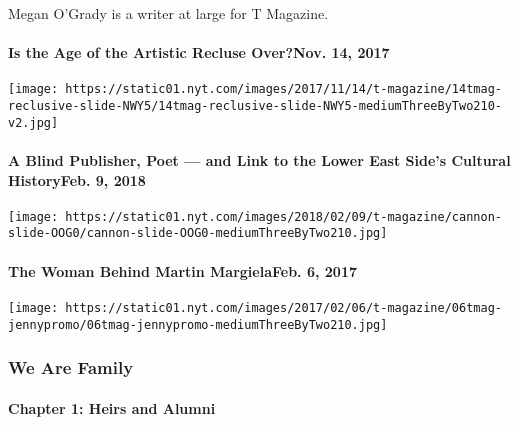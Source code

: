 Megan O'Grady is a writer at large for T Magazine.

\href{https://www.nytimes.com/2017/11/14/t-magazine/artistic-recluse-jd-salinger-thomas-pynchon.html}{}

\hypertarget{is-the-age-of-the-artistic-recluse-overnov-14-2017}{%
\paragraph{Is the Age of the Artistic Recluse Over?Nov. 14,
2017}\label{is-the-age-of-the-artistic-recluse-overnov-14-2017}}

\texttt{[image: https://static01.nyt.com/images/2017/11/14/t-magazine/14tmag-reclusive-slide-NWY5/14tmag-reclusive-slide-NWY5-mediumThreeByTwo210-v2.jpg]}
\href{https://www.nytimes.com/2018/02/09/t-magazine/art/steve-cannon-david-hammons.html}{}

\hypertarget{a-blind-publisher-poet--and-link-to-the-lower-east-sides-cultural-historyfeb-9-2018}{%
\paragraph{A Blind Publisher, Poet --- and Link to the Lower East Side's
Cultural HistoryFeb. 9,
2018}\label{a-blind-publisher-poet--and-link-to-the-lower-east-sides-cultural-historyfeb-9-2018}}

\texttt{[image: https://static01.nyt.com/images/2018/02/09/t-magazine/cannon-slide-OOG0/cannon-slide-OOG0-mediumThreeByTwo210.jpg]}
\href{https://www.nytimes.com/interactive/2017/02/06/t-magazine/jenny-meirens-margiela-interview.html}{}

\hypertarget{the-woman-behind-martin-margielafeb-6-2017}{%
\paragraph{The Woman Behind Martin MargielaFeb. 6,
2017}\label{the-woman-behind-martin-margielafeb-6-2017}}

\texttt{[image: https://static01.nyt.com/images/2017/02/06/t-magazine/06tmag-jennypromo/06tmag-jennypromo-mediumThreeByTwo210.jpg]}

\hypertarget{we-are-family-1}{%
\subsubsection{We Are Family}\label{we-are-family-1}}

\hypertarget{chapter-1-heirs-and-alumni}{%
\paragraph{Chapter 1: Heirs and
Alumni}\label{chapter-1-heirs-and-alumni}}

